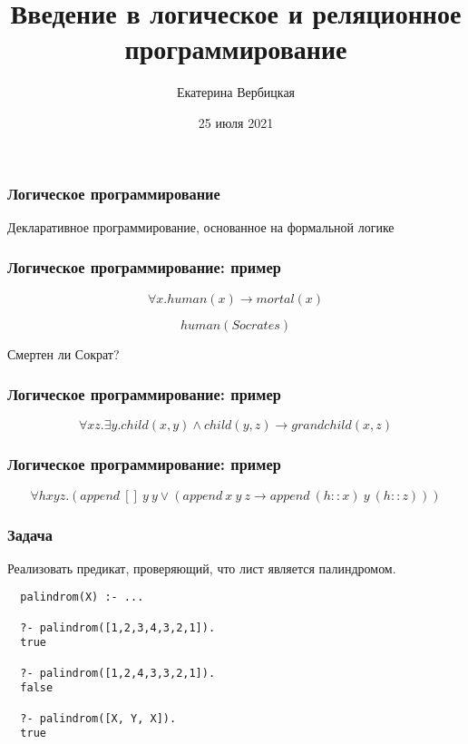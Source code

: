 \documentclass{beamer}
\title[]{Введение в логическое и реляционное программирование}
\subtitle[]{}
\institute[]{
Лаборатория языков инструментов JetBrains\\
}
\author[]{Екатерина Вербицкая}
\date{25 июля 2021}
\begin{document}
{
  \begin{frame}
    \titlepage
  \end{frame}
}


\begin{frame}[fragile]
  \frametitle{Логическое программирование}
\begin{center}
  Декларативное программирование, основанное на формальной логике
\end{center}
\end{frame}

\begin{frame}[fragile]
  \frametitle{Логическое программирование: пример}
\[
  \forall x. human(x) \to mortal(x)
\]

\[
  human(Socrates)
\]

\vspace{1cm}

\begin{center}
  Смертен ли Сократ?
\end{center}
\end{frame}

\begin{frame}[fragile]
  \frametitle{Логическое программирование: пример}
\[
  \forall x z. \exists y. child (x,y) \wedge child(y,z) \to grandchild(x,z)
\]
\end{frame}

\begin{frame}[fragile]
  \frametitle{Логическое программирование: пример}
\[
  \forall h x y z. (append \ [] \ y \ y \vee (append \ x \ y \ z \to append \ (h :: x) \  y \ (h :: z)))
\]
\end{frame}

\begin{frame}[fragile]
  \frametitle{Задача}
Реализовать предикат, проверяющий, что лист является палиндромом.

\begin{verbatim}
  palindrom(X) :- ...

  ?- palindrom([1,2,3,4,3,2,1]).
  true

  ?- palindrom([1,2,4,3,3,2,1]).
  false

  ?- palindrom([X, Y, X]).
  true
\end{verbatim}

\end{frame}



\end{document}
